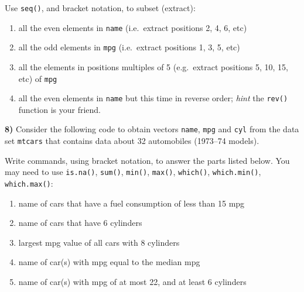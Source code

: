 \documentclass[
]{book}
\newenvironment{Shaded}{\begin{snugshade}}{\end{snugshade}}
\newcommand{\CommentTok}[1]{\textcolor[rgb]{0.56,0.35,0.01}{\textit{#1}}}
\newcommand{\FunctionTok}[1]{\textcolor[rgb]{0.00,0.00,0.00}{#1}}
\newcommand{\NormalTok}[1]{#1}
\newcommand{\OtherTok}[1]{\textcolor[rgb]{0.56,0.35,0.01}{#1}}
\newcommand{\SpecialCharTok}[1]{\textcolor[rgb]{0.00,0.00,0.00}{#1}}
\begin{document}
Use \texttt{seq()}, and bracket notation, to subset (extract):

\begin{enumerate}
\def\labelenumi{\alph{enumi})}
\item
  all the even elements in \texttt{name} (i.e.~extract positions 2, 4, 6, etc)
\item
  all the odd elements in \texttt{mpg} (i.e.~extract positions 1, 3, 5, etc)
\item
  all the elements in positions multiples of 5 (e.g.~extract positions 5, 10,
  15, etc) of \texttt{mpg}
\item
  all the even elements in \texttt{name} but this time in reverse order; \emph{hint} the
  \texttt{rev()} function is your friend.
\end{enumerate}

\textbf{8)} Consider the following code to obtain vectors \texttt{name}, \texttt{mpg} and \texttt{cyl}
from the data set \texttt{mtcars} that contains data about 32 automobiles (1973--74
models).

\begin{Shaded}
\end{Shaded}

Write commands, using bracket notation, to answer the parts listed below.
You may need to use \texttt{is.na()}, \texttt{sum()}, \texttt{min()}, \texttt{max()}, \texttt{which()},
\texttt{which.min()}, \texttt{which.max()}:

\begin{enumerate}
\def\labelenumi{\alph{enumi})}
\item
  name of cars that have a fuel consumption of less than 15 mpg
\item
  name of cars that have 6 cylinders
\item
  largest mpg value of all cars with 8 cylinders
\item
  name of car(s) with mpg equal to the median mpg
\item
  name of car(s) with mpg of at most 22, and at least 6 cylinders
\end{enumerate}
\end{document}
